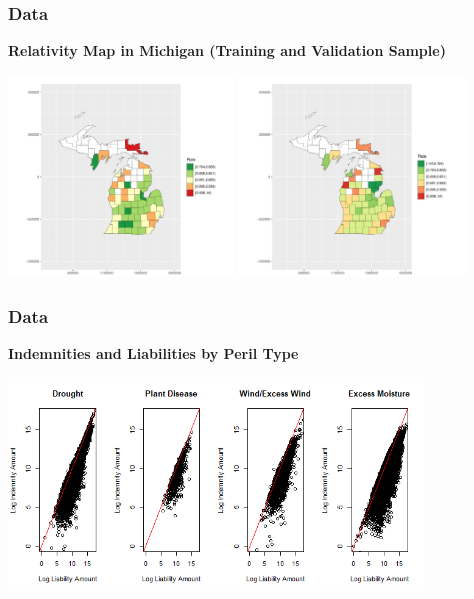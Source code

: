 \documentclass[serif,10pt,aspectratio=169]{beamer}
\begin{document}
\begin{frame}
\frametitle{Data}
\textbf{Relativity Map in Michigan (Training and Validation Sample)}
\begin{center}
\includegraphics[width=6cm]{imgFinal/MapRateIn}
\includegraphics[width=6cm]{imgFinal/MapRateOut}\end{center}
\end{frame}

\begin{frame}
\frametitle{Data}
\textbf{Indemnities and Liabilities by Peril Type}
\begin{center}\includegraphics[width=11cm]{YumaImages/ScatterplotByPerilType.png}\end{center}
\end{frame}
\end{document}
